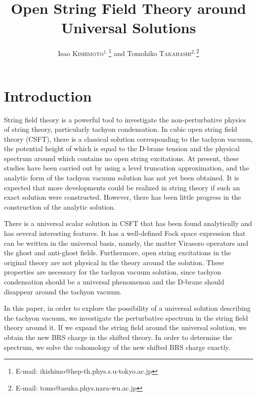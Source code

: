 \documentclass[a4paper,seceq,preprint]{ptptex}
\title{%
Open String Field Theory around Universal Solutions
}
\author{%
Isao \textsc{Kishimoto}$^{1,}$\footnote{
E-mail: ikishimo@hep-th.phys.s.u-tokyo.ac.jp} %
and Tomohiko \textsc{Takahashi}$^{2,}$\footnote{
E-mail: tomo@asuka.phys.nara-wu.ac.jp} %
}
\begin{document}
\maketitle

\section{Introduction}
String field theory is a powerful tool to investigate the non-perturbative
physics of string theory, particularly 
tachyon condensation.
In cubic open string field theory (CSFT),\cite{rf:CSFT}
there is a classical solution corresponding to the tachyon
vacuum,\cite{rf:SZ-tachyon} the potential height of which is equal to the
D-brane tension and 
the physical spectrum around which contains no open string
excitations.\cite{rf:Sen,rf:Ohmori} 
At present, these studies have been carried out
by using a level truncation approximation, and the analytic form of the
tachyon vacuum solution has not yet been
obtained.\cite{rf:KS-tachyon,rf:SZ-tachyon,rf:MT,rf:ET}
It is expected that
more developments could be realized in string theory if such an
exact solution were constructed. However, there has been little progress in
the construction of the analytic
solution.\cite{rf:KP,rf:Schnabl1,rf:TT,rf:TT2,rf:KishiOhmo,rf:Kluson}

There is a universal scalar solution in CSFT that has been found
analytically and has several interesting features.\cite{rf:TT2}
It has a well-defined Fock space expression that can be written in the
universal basis, namely, the matter Virasoro operators and the ghost and
anti-ghost fields. 
Furthermore, open string excitations in the original theory are 
not physical in the theory around the solution. These properties are
necessary for the tachyon vacuum solution, since
tachyon condensation should be  a universal
phenomenon\cite{rf:SZ-tachyon,rf:SenUniv} and the D-brane should disappear
around the tachyon vacuum.\cite{rf:Sen,rf:ET,rf:HT}

In this paper, in order to explore the possibility of a universal
solution describing the tachyon vacuum, we investigate the
perturbative spectrum in the string 
field  theory around it. 
If we expand the string field around the universal solution, we obtain
the new BRS charge in the shifted theory. In order to determine the
spectrum, we solve the cohomology of the new shifted BRS
charge exactly. 
\end{document}

